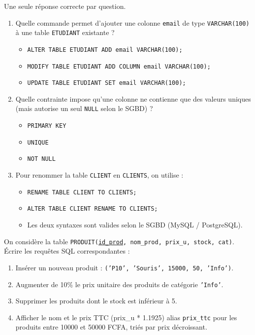 \documentclass[11pt]{article}
\begin{document}
\begin{exercice}
Une seule réponse correcte par question.
\begin{enumerate}
    \item Quelle commande permet d'ajouter une colonne \texttt{email} de type \texttt{VARCHAR(100)} à une table \texttt{ETUDIANT} existante ?
    \begin{itemize}
        \item \texttt{ALTER TABLE ETUDIANT ADD email VARCHAR(100);}
        \item \texttt{MODIFY TABLE ETUDIANT ADD COLUMN email VARCHAR(100);}
        \item \texttt{UPDATE TABLE ETUDIANT SET email VARCHAR(100);}
    \end{itemize}
    \item Quelle contrainte impose qu'une colonne ne contienne que des valeurs uniques (mais autorise un seul \texttt{NULL} selon le SGBD) ?
    \begin{itemize}
        \item \texttt{PRIMARY KEY}
        \item \texttt{UNIQUE}
        \item \texttt{NOT NULL}
    \end{itemize}
    \item Pour renommer la table \texttt{CLIENT} en \texttt{CLIENTS}, on utilise :
    \begin{itemize}
        \item \texttt{RENAME TABLE CLIENT TO CLIENTS;}
        \item \texttt{ALTER TABLE CLIENT RENAME TO CLIENTS;}
        \item Les deux syntaxes sont valides selon le SGBD (MySQL / PostgreSQL).
    \end{itemize}
\end{enumerate}
\end{exercice}

\begin{exercice}
On considère la table \texttt{PRODUIT(\underline{id\_prod}, nom\_prod, prix\_u, stock, cat)}.
Écrire les requêtes SQL correspondantes :
\begin{enumerate}
    \item Insérer un nouveau produit : \texttt{('P10', 'Souris', 15000, 50, 'Info')}.
    \item Augmenter de 10\% le prix unitaire des produits de catégorie \texttt{'Info'}.
    \item Supprimer les produits dont le stock est inférieur à 5.
    \item Afficher le nom et le prix TTC (prix\_u * 1.1925) alias \texttt{prix\_ttc} pour les produits entre 10000 et 50000 FCFA, triés par prix décroissant.
\end{enumerate}
\end{exercice}
\end{document}
